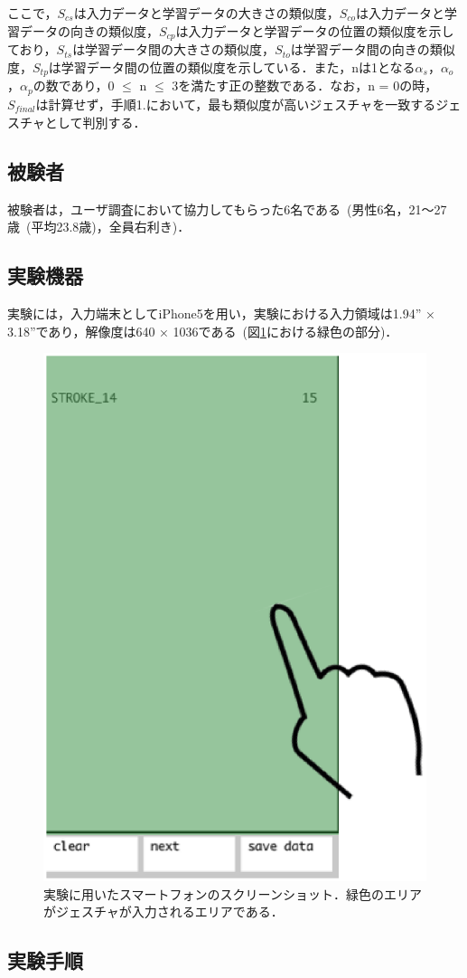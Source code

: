ここで，$S_\textit{cs}$は入力データと学習データの大きさの類似度，$S_\textit{co}$は入力データと学習データの向きの類似度，$S_\textit{cp}$は入力データと学習データの位置の類似度を示しており，$S_\textit{ts}$は学習データ間の大きさの類似度，$S_\textit{to}$は学習データ間の向きの類似度，$S_\textit{tp}$は学習データ間の位置の類似度を示している．また，nは1となる$α_\textit{s}$，$α_\textit{o}$，$α_\textit{p}$の数であり，0 $\leq$ n $\leq$ 3を満たす正の整数である．なお，n = 0の時，$S_\textit{final}$は計算せず，手順1.において，最も類似度が高いジェスチャを一致するジェスチャとして判別する．

\subsection{被験者}
被験者は，ユーザ調査において協力してもらった6名である~(男性6名，21〜27歳~(平均23.8歳)，全員右利き)．

\subsection{実験機器}
実験には，入力端末としてiPhone5を用い，実験における入力領域は1.94'' × 3.18''であり，解像度は640 × 1036である~(図\ref{fig:screenshot}における緑色の部分)．

\begin{figure}[!h]
\centering
\includegraphics[width=0.4\columnwidth]{img/screenshot.eps}
\caption{実験に用いたスマートフォンのスクリーンショット．緑色のエリアがジェスチャが入力されるエリアである．}
\label{fig:screenshot}
\end{figure}


\subsection{実験手順}
